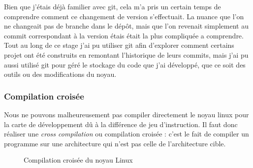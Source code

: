 Bien que j'étais déjà familier avec git, cela m'a pris un certain temps de comprendre comment ce changement de version s'effectuait. La nuance que l'on ne changeait pas de branche dans le dépôt, mais que l'on revenait simplement au commit correspondant à la version étais était la plus compliquée a comprendre. Tout au long de ce stage j'ai pu utiliser \gls{git} afin d'explorer comment certains projet ont été construits en remontant l'historique de leurs commits, mais j'ai pu aussi utilisé \gls{git} pour géré le stockage du code que j'ai développé, que ce soit des outils ou des modifications du noyau.  


\subsubsection{Compilation croisée}

Nous ne pouvons malheureusement pas compiler directement le noyau linux pour la carte de développement dû à la différence de jeu d'instruction. Il faut donc réaliser une \textit{cross compilation} ou compilation croisée : c'est le fait de compiler un programme sur une architecture qui n'est pas celle de l'architecture cible.

\begin{figure}[H]
    \centering

    \caption{Compilation croisée du noyau Linux}

\end{figure}

